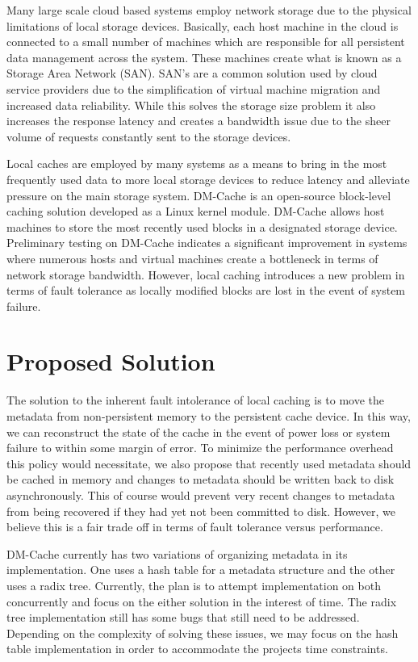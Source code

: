 \documentclass[letterpaper,12pt]{article}
\begin{document}
Many large scale cloud based systems employ network storage due to the
physical limitations of local storage devices. Basically, each host
machine in the cloud is connected to a small number of machines which
are responsible for all persistent data management across the system.
These machines create what is known as a Storage Area Network (SAN).
SAN's are a common solution used by cloud service providers due to the
simplification of virtual machine migration and increased data
reliability. While this solves the storage size problem it also
increases the response latency and creates a bandwidth issue due to
the sheer volume of requests constantly sent to the storage devices.

Local caches are employed by many systems as a means to bring in the
most frequently used data to more local storage devices to reduce
latency and alleviate pressure on the main storage system. DM-Cache is
an open-source block-level caching solution developed as a Linux
kernel module. DM-Cache allows host machines to store the most
recently used blocks in a designated storage device. Preliminary
testing on DM-Cache indicates a significant improvement in systems
where numerous hosts and virtual machines create a bottleneck in terms
of network storage bandwidth. However, local caching introduces a new
problem in terms of fault tolerance as locally modified blocks are
lost in the event of system failure.


\section*{Proposed Solution}

The solution to the inherent fault intolerance of local caching is to
move the metadata from non-persistent memory to the persistent cache
device. In this way, we can reconstruct the state of the cache in the
event of power loss or system failure to within some margin of
error. To minimize the performance overhead this policy would
necessitate, we also propose that recently used metadata should be
cached in memory and changes to metadata should be written back to
disk asynchronously. This of course would prevent very recent changes
to metadata from being recovered if they had yet not been committed to
disk. However, we believe this is a fair trade off in terms of fault
tolerance versus performance.

DM-Cache currently has two variations of organizing metadata in its
implementation. One uses a hash table for a metadata structure and the
other uses a radix tree. Currently, the plan is to attempt
implementation on both concurrently and focus on the either solution
in the interest of time. The radix tree implementation still has some
bugs that still need to be addressed. Depending on the complexity of
solving these issues, we may focus on the hash table implementation in
order to accommodate the projects time constraints.
\end{document}
